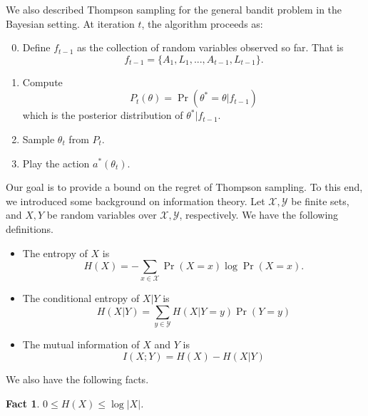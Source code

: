 \documentclass[11pt]{article}
\newtheorem{fact}{Fact}
\begin{document}
We also described Thompson sampling for the general bandit problem in the Bayesian setting. At iteration $t$, the algorithm proceeds as:
\begin{enumerate}
  \setcounter{enumi}{-1}
  \item Define $f_{t-1}$ as the collection of random variables observed so far. That is
  \begin{equation*}
      f_{t-1} = \{A_1, L_1, ..., A_{t-1}, L_{t-1}\}.
  \end{equation*}
  
  \item Compute
  \begin{equation*}
      P_t(\theta) = \Pr(\theta^* = \theta | f_{t-1})
  \end{equation*}
  which is the posterior distribution of $\theta^* | f_{t-1}$.
  
  \item Sample $\theta_t$ from $P_t$.
  
  \item Play the action $a^*(\theta_t)$.
\end{enumerate}

Our goal is to provide a bound on the regret of Thompson sampling. To this end, we introduced some background on information theory. Let $\mathcal{X}, \mathcal{Y}$ be finite sets, and $X, Y$ be random variables over $\mathcal{X}, \mathcal{Y}$, respectively. We have the following definitions.

\begin{itemize}
    \item The entropy of $X$ is
    \begin{equation*}
        H(X) = - \sum_{x \in \mathcal{X}} \Pr(X = x) \log\Pr(X = x).
    \end{equation*}
    
    \item The conditional entropy of $X|Y$ is 
    \begin{equation*}
        H(X|Y) = \sum_{y \in \mathcal{Y}} H(X|Y = y) \Pr(Y = y)
    \end{equation*}
    
    \item The mutual information of $X$ and $Y$ is
    \begin{equation*}
        I(X;Y) = H(X) - H(X|Y)
    \end{equation*}
\end{itemize}

We also have the following facts.
\begin{fact}\label{basic_ineq}
$0 \le H(X) \le \log|X|$.
\end{fact}
\end{document}
